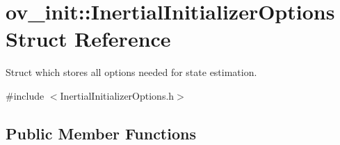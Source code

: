 \hypertarget{structov__init_1_1InertialInitializerOptions}{}\section{ov\+\_\+init\+:\+:Inertial\+Initializer\+Options Struct Reference}
\label{structov__init_1_1InertialInitializerOptions}


Struct which stores all options needed for state estimation.  




{\ttfamily \#include $<$Inertial\+Initializer\+Options.\+h$>$}

\subsection*{Public Member Functions}
